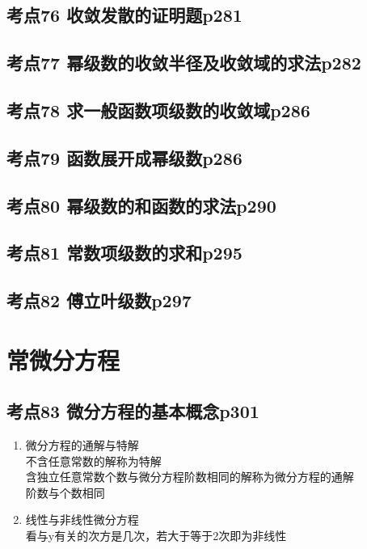 \section{考点76 收敛发散的证明题p281}

\section{考点77 幂级数的收敛半径及收敛域的求法p282}

\section{考点78 求一般函数项级数的收敛域p286}

\section{考点79 函数展开成幂级数p286}

\section{考点80 幂级数的和函数的求法p290}

\section{考点81 常数项级数的求和p295}

\section{考点82 傅立叶级数p297}

\chapter{常微分方程}

\section{考点83 微分方程的基本概念p301}

\begin{enumerate}
    \item 微分方程的通解与特解\\
        不含任意常数的解称为特解\\
        含独立任意常数个数与微分方程阶数相同的解称为微分方程的通解\\
        阶数与个数相同
    \item 线性与非线性微分方程\\
    看与y有关的次方是几次，若大于等于2次即为非线性

\end{enumerate}

